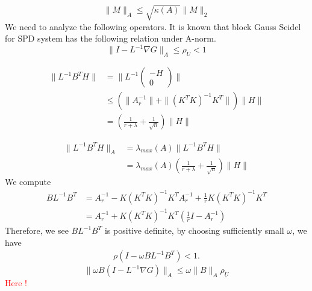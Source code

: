 \begin{equation}
    \|M \|_A \leq \sqrt{ \kappa(A)} \| M \|_2
\end{equation}
We need to analyze the following operators. 
It is known that block Gauss Seidel for SPD system has the following relation under A-norm.
\begin{equation}
    \| I - L^{-1} \nabla G \|_A \leq \rho_U < 1 
\end{equation}


\begin{equation}
\begin{aligned}
   \| L^{-1} B^T H \| & = \| L^{-1}  \begin{pmatrix}
   -H \\
   0
   \end{pmatrix}\|  \\
   & \leq \left(\|A_r^{-1}\| +\| (K^T K)^{-1}K^T \|\right) \|H\| \\
   & = (\frac{1}{r + \lambda } + \frac{1}{\sqrt{n}} ) \|H\| 
\end{aligned}
\end{equation}


\begin{equation}
\begin{aligned}
   \| L^{-1} B^T H \|_A & = \lambda_{max}(A) \| L^{-1} B^T H\| \\
   & =\lambda_{max}(A) (\frac{1}{r + \lambda } + \frac{1}{\sqrt{n}} ) \|H\| 
\end{aligned}
\end{equation}
We compute 
\begin{equation}
\begin{aligned}
       BL^{-1}B^T & = A_r^{-1} - K (K^T K)^{-1} K^T A_r^{-1} + \frac{1}{r}K (K^T K)^{-1}K^T \\
       & = A_r^{-1} + K (K^T K)^{-1} K^T (\frac{1}{r} I - A_r^{-1})
\end{aligned}
\end{equation}
Therefore, we see $BL^{-1} B^T$ is positive definite, by choosing sufficiently small $\omega$, we have
\begin{equation}
\begin{aligned}
   \rho ( I - \omega B L^{-1} B^T ) < 1 .
\end{aligned}
\end{equation}
\begin{equation}
     \| \omega B (I - L^{-1} \nabla G) \|_A \leq \omega \|B \|_A \rho_U
\end{equation}
\textcolor{red}{ Here !} 

